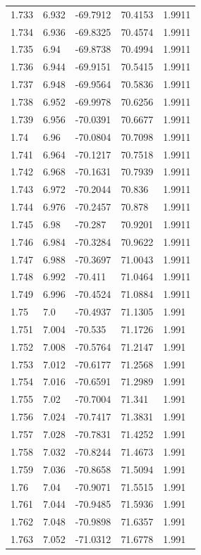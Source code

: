 \begin{tabular}{lllll}
1.733 & 6.932 & -69.7912 & 70.4153 & 1.9911 \\
1.734 & 6.936 & -69.8325 & 70.4574 & 1.9911 \\
1.735 & 6.94 & -69.8738 & 70.4994 & 1.9911 \\
1.736 & 6.944 & -69.9151 & 70.5415 & 1.9911 \\
1.737 & 6.948 & -69.9564 & 70.5836 & 1.9911 \\
1.738 & 6.952 & -69.9978 & 70.6256 & 1.9911 \\
1.739 & 6.956 & -70.0391 & 70.6677 & 1.9911 \\
1.74 & 6.96 & -70.0804 & 70.7098 & 1.9911 \\
1.741 & 6.964 & -70.1217 & 70.7518 & 1.9911 \\
1.742 & 6.968 & -70.1631 & 70.7939 & 1.9911 \\
1.743 & 6.972 & -70.2044 & 70.836 & 1.9911 \\
1.744 & 6.976 & -70.2457 & 70.878 & 1.9911 \\
1.745 & 6.98 & -70.287 & 70.9201 & 1.9911 \\
1.746 & 6.984 & -70.3284 & 70.9622 & 1.9911 \\
1.747 & 6.988 & -70.3697 & 71.0043 & 1.9911 \\
1.748 & 6.992 & -70.411 & 71.0464 & 1.9911 \\
1.749 & 6.996 & -70.4524 & 71.0884 & 1.9911 \\
1.75 & 7.0 & -70.4937 & 71.1305 & 1.991 \\
1.751 & 7.004 & -70.535 & 71.1726 & 1.991 \\
1.752 & 7.008 & -70.5764 & 71.2147 & 1.991 \\
1.753 & 7.012 & -70.6177 & 71.2568 & 1.991 \\
1.754 & 7.016 & -70.6591 & 71.2989 & 1.991 \\
1.755 & 7.02 & -70.7004 & 71.341 & 1.991 \\
1.756 & 7.024 & -70.7417 & 71.3831 & 1.991 \\
1.757 & 7.028 & -70.7831 & 71.4252 & 1.991 \\
1.758 & 7.032 & -70.8244 & 71.4673 & 1.991 \\
1.759 & 7.036 & -70.8658 & 71.5094 & 1.991 \\
1.76 & 7.04 & -70.9071 & 71.5515 & 1.991 \\
1.761 & 7.044 & -70.9485 & 71.5936 & 1.991 \\
1.762 & 7.048 & -70.9898 & 71.6357 & 1.991 \\
1.763 & 7.052 & -71.0312 & 71.6778 & 1.991 \\

\end{tabular}
